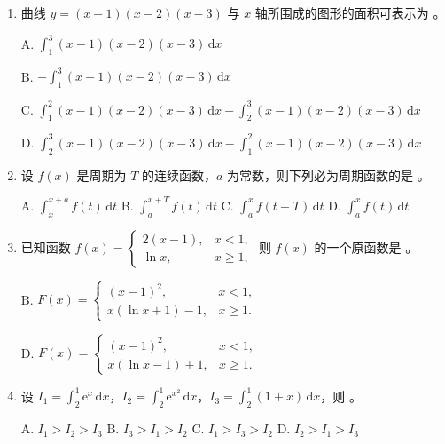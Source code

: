 \documentclass[a4paper,11pt]{ctexart}
\newcommand{\dd}{\,\mathrm{d}}
\newcommand{\e}{\mathrm{e}}
\newcommand{\choice}[1]{\text{【\quad】}}
\begin{document}
\begin{enumerate}[label=\arabic*., leftmargin=2em, itemsep=0.4em, topsep=0.35em]
  \item 曲线 $y=(x-1)(x-2)(x-3)$ 与 $x$ 轴所围成的图形的面积可表示为 \choice{}。

  A. $\displaystyle\int_1^3 (x-1)(x-2)(x-3)\dd x$

  B. $-\displaystyle\int_1^3 (x-1)(x-2)(x-3)\dd x$

  C. $\displaystyle\int_1^2 (x-1)(x-2)(x-3)\dd x - \int_2^3 (x-1)(x-2)(x-3)\dd x$

  D. $\displaystyle\int_2^3 (x-1)(x-2)(x-3)\dd x - \int_1^2 (x-1)(x-2)(x-3)\dd x$

  \item 设 $f(x)$ 是周期为 $T$ 的连续函数，$a$ 为常数，则下列必为周期函数的是 \choice{}。

  A. $\displaystyle\int_x^{x+a} f(t)\dd t$ \qquad\quad
  B. $\displaystyle\int_a^{x+T} f(t)\dd t$ \qquad\quad
  C. $\displaystyle\int_a^x f(t+T)\dd t$ \qquad\quad
  D. $\displaystyle\int_a^x f(t)\dd t$

  \item 已知函数 $f(x)=\begin{cases}2(x-1), & x<1,\\ \ln x, & x\ge 1,\end{cases}$ 则 $f(x)$ 的一个原函数是 \choice{}。

  B. $F(x)=\begin{cases}(x-1)^2, & x<1,\\ x(\ln x+1)-1, & x\ge 1.\end{cases}$

  \vspace{0.4em}
  D. $F(x)=\begin{cases}(x-1)^2, & x<1,\\ x(\ln x-1)+1, & x\ge 1.\end{cases}$

  \item 设 $I_1=\displaystyle\int_2^1 \e^x\dd x$，$I_2=\displaystyle\int_2^1 \e^{x^2}\dd x$，$I_3=\displaystyle\int_2^1 (1+x)\dd x$，则 \choice{}。

  A. $I_1>I_2>I_3$ \qquad\quad
  B. $I_3>I_1>I_2$ \qquad\quad
  C. $I_1>I_3>I_2$ \qquad\quad
  D. $I_2>I_1>I_3$
\end{enumerate}
\end{document}
